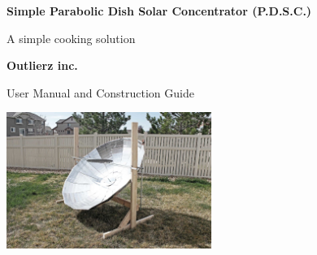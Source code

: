 \documentclass[titlepage]{article}
\begin{document}
    \begin{titlepage}
        \begin{center}
            \vspace*{1cm}
    
            \Huge
            \textbf{Simple Parabolic Dish Solar Concentrator (P.D.S.C.)}
    
            \vspace{0.5cm}
            \LARGE
            A simple cooking solution
    
            \vspace{1.5cm}
    
            \textbf{Outlierz inc.}
    
            \vspace{3.5cm}
    
            User Manual and Construction Guide
    
            \vspace{0.8cm}
    
            \includegraphics[width=0.5\textwidth]{finished_cooker}    
        \end{center}
    \end{titlepage}  
        
    
    \tableofcontents
    \listoffigures
    \newpage
\end{document}
